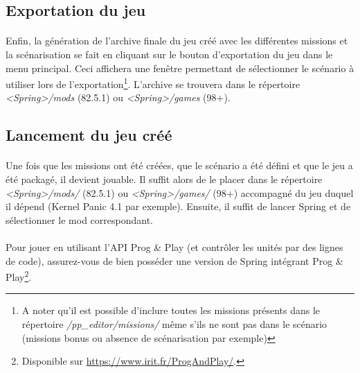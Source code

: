 \documentclass[a4paper]{article}
\begin{document}
\subsection{Exportation du jeu}\label{export-game}
\paragraph{ }
Enfin, la génération de l'archive finale du jeu créé avec les différentes missions et la scénarisation se fait en cliquant sur le bouton d'exportation du jeu dans le menu principal. Ceci affichera une fenêtre permettant de sélectionner le scénario à utiliser lors de l'exportation\footnote{A noter qu'il est possible d'inclure toutes les missions présents dans le répertoire \textit{/pp\_editor/missions/} même s'ils ne sont pas dans le scénario (missions bonus ou absence de scénarisation par exemple)}. L'archive se trouvera dans le répertoire \textit{<Spring>/mods} (82.5.1) ou \textit{<Spring>/games} (98+).
\subsection{Lancement du jeu créé}
\paragraph{ }
Une fois que les missions ont été créées, que le scénario a été défini et que le jeu a été packagé, il devient jouable. Il suffit alors de le placer dans le répertoire \textit{<Spring>/mods/} (82.5.1) ou \textit{<Spring>/games/} (98+) accompagné du jeu duquel il dépend (Kernel Panic 4.1 par exemple). Ensuite, il suffit de lancer Spring et de sélectionner le mod correspondant.
\paragraph{ }
Pour jouer en utilisant l'API Prog \& Play (et contrôler les unités par des lignes de code), assurez-vous de bien posséder une version de Spring intégrant Prog \& Play\footnote{Disponible sur \url{https://www.irit.fr/ProgAndPlay/}.}.
\end{document}
